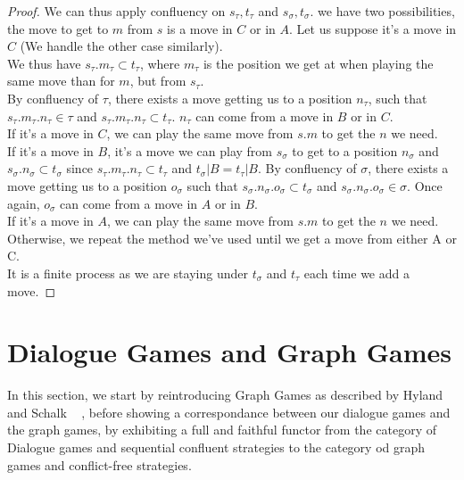\documentclass[a4paper,UKenglish]{lipics}
\begin{document}
\begin{proof}
We can thus apply confluency on $s_\tau, t_\tau$ and $s_\sigma, t_\sigma$. 
we have two possibilities, the move to get to $m$ from $s$ is a move in $C$ or in $A$.  Let us suppose it's a move in $C$ (We handle the other case similarly).\\ We thus have $s_\tau.m_\tau \subset t_\tau$, where $m_\tau$ is the position we get at when playing the same move than for $m$, but from $s_\tau$. \\By confluency of $\tau$, there exists a move getting us to a position $n_\tau$, such that $s_\tau.m_\tau.n_\tau \in \tau$ and $s_\tau.m_\tau.n_\tau \subset t_\tau$. $n_\tau$ can come from a move in $B$ or in $C$.\\ If it's a move in $C$, we can play the same move from $s.m$ to get the $n$ we need.\\ If it's a move in $B$, it's a move we can play from $s_\sigma$ to get to a position $n_\sigma$ and $s_\sigma.n_\sigma \subset t_\sigma$ since $s_\tau.m_\tau.n_\tau \subset t_\tau$ and $t_\sigma|B=t_\tau|B$. By confluency of $\sigma$, there exists a move getting us to a position $o_\sigma$ such that $s_\sigma.n_\sigma.o_\sigma \subset t_\sigma$ and 
$s_\sigma.n_\sigma.o_\sigma \in \sigma$. Once again, $o_\sigma$ can come from a move in $A$ or in $B$.\\ If it's a move in $A$, we can play the same move from $s.m$ to get the $n$ we need.\\ Otherwise, we repeat the method we've used until we get a move from either A or C. \\It is a finite process as we are staying under $t_\sigma$ and $t_\tau$ each time we add a move.



\end{proof}
\section{Dialogue Games and Graph Games}
In this section, we start by reintroducing Graph Games as described by Hyland and Schalk ~\cite{} , before showing a correspondance between our dialogue games and the graph games, by exhibiting a full and faithful functor from the category of Dialogue games and sequential confluent strategies to the category od graph games and conflict-free strategies.\\
\end{document}
